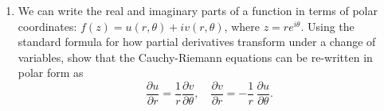 \documentclass[10pt,a4paper]{article}
\begin{document}
\begin{enumerate}
\item
We can write the real and imaginary parts of a function in terms of
polar coordinates: $f(z) = u(r,\theta) + i v(r,\theta)$, where $z =
re^{i\theta}$. Using the standard formula for how partial derivatives
transform under a change of variables, show that the Cauchy-Riemann
equations can be re-written in polar form as
\begin{equation}
\frac{\partial u}{\partial r} =  \frac{1}{r} \frac{\partial v}{\partial \theta}, \quad \frac{\partial v}{\partial r} =  - \frac{1}{r}\,  \frac{\partial u}{\partial \theta}.
\end{equation}
\end{enumerate}
\end{document}
